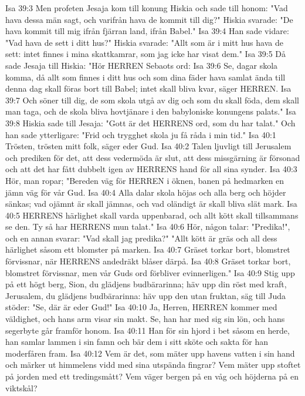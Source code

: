 Isa 39:3  Men profeten Jesaja kom till konung Hiskia och sade till honom: "Vad hava dessa män sagt, och varifrån hava de kommit till dig?" Hiskia svarade: "De hava kommit till mig ifrån fjärran land, ifrån Babel."
Isa 39:4  Han sade vidare: "Vad hava de sett i ditt hus?" Hiskia svarade: "Allt som är i mitt hus hava de sett: intet finnes i mina skattkamrar, som jag icke har visat dem."
Isa 39:5  Då sade Jesaja till Hiskia: "Hör HERREN Sebaots ord:
Isa 39:6  Se, dagar skola komma, då allt som finnes i ditt hus och som dina fäder hava samlat ända till denna dag skall föras bort till Babel; intet skall bliva kvar, säger HERREN.
Isa 39:7  Och söner till dig, de som skola utgå av dig och som du skall föda, dem skall man taga, och de skola bliva hovtjänare i den babyloniske konungens palats."
Isa 39:8  Hiskia sade till Jesaja: "Gott är det HERRENS ord, som du har talat." Och han sade ytterligare: "Frid och trygghet skola ju få råda i min tid."
Isa 40:1  Trösten, trösten mitt folk, säger eder Gud.
Isa 40:2  Talen ljuvligt till Jerusalem och prediken för det, att dess vedermöda är slut, att dess missgärning är försonad och att det har fått dubbelt igen av HERRENS hand för all sina synder.
Isa 40:3  Hör, man ropar; "Bereden väg för HERREN i öknen, banen på hedmarken en jämn väg för vår Gud.
Isa 40:4  Alla dalar skola höjas och alla berg och höjder sänkas; vad ojämnt är skall jämnas, och vad oländigt är skall bliva slät mark.
Isa 40:5  HERRENS härlighet skall varda uppenbarad, och allt kött skall tillsammans se den. Ty så har HERRENS mun talat."
Isa 40:6  Hör, någon talar: "Predika!", och en annan svarar: "Vad skall jag predika?" "Allt kött är gräs och all dess härlighet såsom ett blomster på marken.
Isa 40:7  Gräset torkar bort, blomstret förvissnar, när HERRENS andedräkt blåser därpå.
Isa 40:8  Gräset torkar bort, blomstret förvissnar, men vår Guds ord förbliver evinnerligen."
Isa 40:9  Stig upp på ett högt berg, Sion, du glädjens budbärarinna; häv upp din röst med kraft, Jerusalem, du glädjens budbärarinna: häv upp den utan fruktan, säg till Juda stöder: "Se, där är eder Gud!"
Isa 40:10  Ja, Herren, HERREN kommer med väldighet, och hans arm visar sin makt. Se, han har med sig sin lön, och hans segerbyte går framför honom.
Isa 40:11  Han för sin hjord i bet såsom en herde, han samlar lammen i sin famn och bär dem i sitt sköte och sakta för han moderfåren fram.
Isa 40:12  Vem är det, som mäter upp havens vatten i sin hand och märker ut himmelens vidd med sina utspända fingrar? Vem mäter upp stoftet på jorden med ett tredingsmått? Vem väger bergen på en våg och höjderna på en viktskål?
